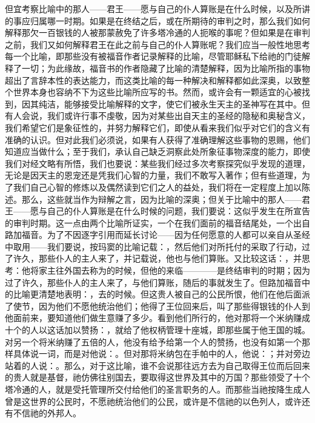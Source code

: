 但宜考察比喻中的那人——君王——愿与自己的仆人算账是在什么时候，以及所讲的事应归属哪一时期。如果是在终结之后，或在所期待的审判之时，那么我们如何解释那欠一百银钱的人被那蒙赦免了许多塔冷通的人扼喉的事呢？但如果是在审判之前，我们又如何解释君王在此之前与自己的仆人算账呢？我们应当一般性地思考每一个比喻，即那些没有被福音作者记录解释的比喻，尽管耶稣私下给祂的门徒解释了一切；为此缘故，福音书的作者隐藏了比喻的清楚解释，因为比喻所指的事物超出了言辞本性的表达能力，而这类比喻的每一种解决和解释都如此深奥，以致整个世界本身也容纳不下为这些比喻所应写的书。然而，或许会有一颗适宜的心被找到，因其纯洁，能够接受比喻解释的文字，使它们被永生天主的圣神写在其中。但有人会说，我们或许行事不虔敬，因为对某些出自天主的圣经的隐秘和奥秘含义，我们希望它们是象征性的，并努力解释它们，即使从看来我们似乎对它们的含义有准确的认识。但对此我们必须说，如果有人获得了准确理解这些事物的恩赐，他们知道应当做什么；至于我们，承认自己缺乏洞察此处所象征事物深度的能力，即使我们对经文略有所悟，我们也要说：某些我们经过多次考察探究似乎发现的道理，无论是因天主的恩宠还是凭我们心智的力量，我们不敢写入著作；但有些道理，为了我们自己心智的修炼以及偶然读到它们之人的益处，我们将在一定程度上加以陈述。那么，这些就当作为辩解之言，因为比喻的深奥；但关于比喻中的那人——君王——愿与自己的仆人算账是在什么时候的问题，我们要说：这似乎发生在所宣告的审判时期。这一点由两个比喻所证实，一个在我们面前的福音结尾处，一个出自路加福音。为了不因逐字引用而延长讨论——因为任何愿意的人都可以亲自从圣经中取用——我们要说，按玛窦的比喻记载：，然后他们对所托付的采取了行动，过了许久，那些仆人的主人来了，并记载说，他也与他们算账。又比较这话：，并思考：他将家主往外国去称为的时候，但他的来临————是终结审判的时期；因为过了许久，那些仆人的主人来了，与他们算账，随后的事就发生了。但路加福音中的比喻更清楚地表明：，去的时候。但这贵人被自己的公民所恨，他们在他后面派了使节，因为他们不愿他统治他们；他得了王位回来后，叫了那些得银钱的仆人到他面前来，要知道他们做生意赚了多少。看到他们所行的，他对那将一个米纳赚成十个的人以这话加以赞扬：，就给了他权柄管理十座城，即那些属于他王国的城。对另一个将米纳赚了五倍的人，他没有给予给第一个人的赞扬，也没有如第一个那样具体说一词，而是对他说：。但对那将米纳包在手帕中的人，他说：；并对旁边站着的人说：。那么，对于这比喻，谁不会说那往远方去为自己取得王位而后回来的贵人就是基督，祂仿佛往别国去，要取得这世界及其中的万国？那些领受了十个塔冷通的人，就是受托管理所交付给他们的圣言职务的人。而那些当祂按降生成人曾是这世界的公民时，不愿祂统治他们的公民，或许是不信祂的以色列人，或许还有不信祂的外邦人。\par

